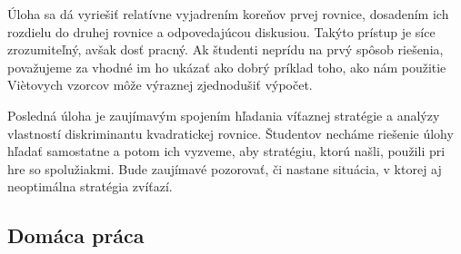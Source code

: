 

\kom Úloha sa dá vyriešiť relatívne  vyjadrením koreňov prvej rovnice, dosadením ich rozdielu do druhej rovnice a odpovedajúcou diskusiou. Takýto prístup je síce zrozumiteľný, avšak dosť pracný. Ak študenti neprídu na prvý spôsob riešenia, považujeme za vhodné im ho ukázať ako dobrý príklad toho, ako nám použitie Viètovych vzorcov môže výraznej zjednodušiť výpočet.



\kom Posledná úloha je zaujímavým spojením hľadania víťaznej stratégie a analýzy vlastností diskriminantu kvadratickej rovnice. Študentov necháme riešenie úlohy hľadať samostatne a potom ich vyzveme, aby stratégiu, ktorú našli, použili pri hre so spolužiakmi. Bude zaujímavé pozorovať, či nastane situácia, v ktorej aj neoptimálna stratégia zvíťazí.


\subsection*{Domáca práca}









